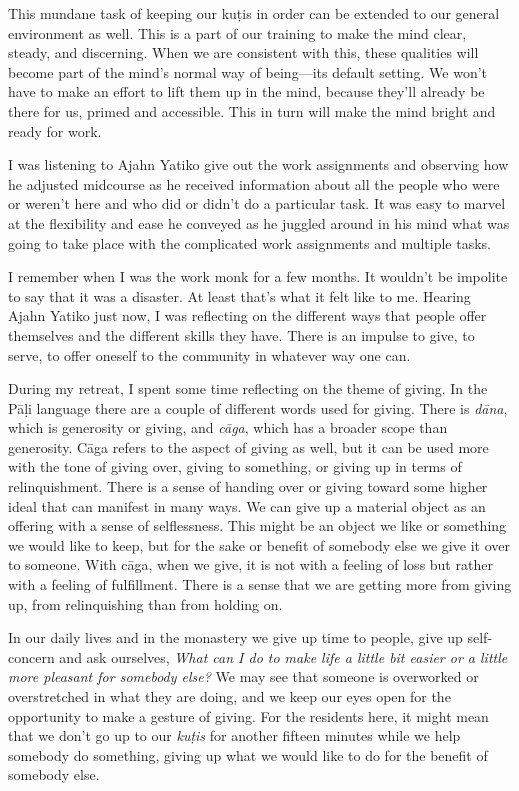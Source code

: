 This mundane task of keeping our kuṭis in order can be extended to 
our general environment as well. This is a part of our training to make 
the mind clear, steady, and discerning. When we are consistent with 
this, these qualities will become part of the mind's normal way of 
being---its default setting. We won't have to make an effort to lift 
them up in the mind, because they'll already be there for us, primed 
and accessible. This in turn will make the mind bright and ready for 
work.


I was listening to Ajahn Yatiko give out the work assignments and 
observing how he adjusted midcourse as he received information about 
all the people who were or weren't here and who did or didn't do a 
particular task. It was easy to marvel at the flexibility and ease he 
conveyed as he juggled around in his mind what was going to take place 
with the complicated work assignments and multiple tasks.

I remember when I was the work monk for a few months. It wouldn't be 
impolite to say that it was a disaster. At least that's what it felt 
like to me. Hearing Ajahn Yatiko just now, I was reflecting on the 
different ways that people offer themselves and the different skills 
they have. There is an impulse to give, to serve, to offer oneself to 
the community in whatever way one can.

During my retreat, I spent some time reflecting on the theme of giving. 
In the Pāḷi language there are a couple of different words used for 
giving. There is \emph{dāna}, which is generosity or giving, and 
\emph{cāga}, which has a broader scope than generosity. Cāga refers 
to the aspect of giving as well, but it can be used more with the tone 
of giving over, giving to something, or giving up in terms of 
relinquishment. There is a sense of handing over or giving toward some 
higher ideal that can manifest in many ways. We can give up a material 
object as an offering with a sense of selflessness. This might be an 
object we like or something we would like to keep, but for the sake or 
benefit of somebody else we give it over to someone. With cāga, when 
we give, it is not with a feeling of loss but rather with a feeling of 
fulfillment. There is a sense that we are getting more from giving up, 
from relinquishing than from holding on.

In our daily lives and in the monastery we give up time to people, give 
up self-concern and ask ourselves, \emph{What can I do to make life a 
little bit easier or a little more pleasant for somebody else?} We may 
see that someone is overworked or overstretched in what they are doing, 
and we keep our eyes open for the opportunity to make a gesture of 
giving. For the residents here, it might mean that we don't go up to 
our \emph{kuṭis} for another fifteen minutes while we help somebody 
do something, giving up what we would like to do for the benefit of 
somebody else.

